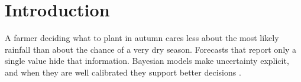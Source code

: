 \chapter{Introduction}
\label{ch:introduction}

A farmer deciding what to plant in autumn cares less about the most likely rainfall than about
the chance of a very dry season. Forecasts that report only a single value hide that
information. Bayesian models make uncertainty explicit, and when they are well calibrated they
support better decisions \citep{gneiting2007}.
